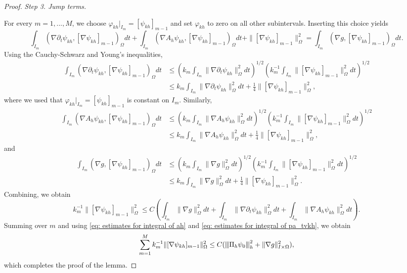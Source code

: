 \documentclass[10pt,a4paper]{amsart}
\newcommand{\Om}{\Omega}
\newcommand{\na}{\nabla}
\newcommand{\vertiii}[1]{{\left\vert\kern-0.25ex\left\vert\kern-0.25ex\left\vert #1
    \right\vert\kern-0.25ex\right\vert\kern-0.25ex\right\vert}}
\begin{document}
\begin{proof}
{\it Step 3. Jump terms.}


For every $m=1,...,M$, we choose $\varphi_{kh}|_{I_m} =[\psi_{kh}]_{m-1}$ and set $\varphi_{kh}$
to zero on all other subintervals. Inserting this choice yields
$$
\int_{I_m}(\na\partial_t\psi_{kh},[\na \psi_{kh}]_{m-1})_\Om dt+\int_{I_m}(\na A_h\psi_{kh},[\na \psi_{kh}]_{m-1})_\Om dt +\|[\na \psi_{kh}]_{m-1}\|^2_\Omega =\int_{I_m} (\na g, [\na \psi_{kh}]_{m-1})_\Om dt.
$$
Using the Cauchy-Schwarz and Young's inequalities,
$$
\begin{aligned}
\int_{I_m}(\na\partial_t\psi_{kh},[\na \psi_{kh}]_{m-1})_\Om dt&\le 
\left(k_m\int_{I_m}\|\na\partial_t\psi_{kh}\|^2_\Omega dt\right)^{1/2}\left(k^{-1}_m\int_{I_m}\|[\na \psi_{kh}]_{m-1} \|^2_\Omega dt\right)^{1/2}\\
&\le 
k_m\int_{I_m}\|\na\partial_t\psi_{kh}\|^2_\Omega dt+\frac{1}{4}\|[\na \psi_{kh}]_{m-1} \|^2_\Omega,
\end{aligned}
$$
where we used that $\varphi_{kh}|_{I_m} = [\psi_{kh}]_{m-1}$ is constant on $I_m$. Similarly,
$$
\begin{aligned}
\int_{I_m}(\na A_h\psi_{kh},[\na \psi_{kh}]_{m-1})_\Om dt&\le 
\left(k_m\int_{I_m}\|\na A_h\psi_{kh}\|^2_\Omega dt\right)^{1/2}\left(k^{-1}_m\int_{I_m}\|[\na \psi_{kh}]_{m-1} \|^2_\Omega dt\right)^{1/2}\\
&\le 
k_m\int_{I_m}\|\na A_h\psi_{kh}\|^2_\Omega dt+\frac{1}{4}\|[\na \psi_{kh}]_{m-1} \|^2_\Omega,
\end{aligned}
$$
and
$$
\begin{aligned}
  \int_{I_m} (\na g, [\na \psi_{kh}]_{m-1})_\Om dt&\le \left(k_m\int_{I_m}\|\na g\|^2_\Omega dt\right)^{1/2}\left(k^{-1}_m\int_{I_m}\|[\na \psi_{kh}]_{m-1} \|^2_\Omega dt\right)^{1/2}\\
                                             &\le k_m\int_{I_m}\|\na g\|^2_\Omega dt+\frac{1}{4}\|[\na \psi_{kh}]_{m-1} \|^2_\Omega.
\end{aligned}
$$
Combining, we obtain
$$
k^{-1}_m\|[\na \psi_{kh}]_{m-1}\|^2_\Omega \le C\left(\int_{I_m}\|\na g\|^2_\Omega dt+\int_{I_m}\|\na\partial_t\psi_{kh}\|^2_\Omega dt+\int_{I_m}\|\na A_h\psi_{kh}\|^2_\Omega dt\right).
$$ 
Summing over $m$ and using \eqref{eq: estimates for integral of ah} and \eqref{eq: estimates for integral of pa_tvkh}, we obtain
$$
\sum_{m=1}^Mk^{-1}_m\|[\na \psi_{kh}]_{m-1}\|^2_\Omega 
\le C(\vertiii{\Pi_h \psi_0}^2_h + \|\na g\|^2_{I\times \Om}),
$$
which completes the proof of the lemma. 
\end{proof}
\end{document}
